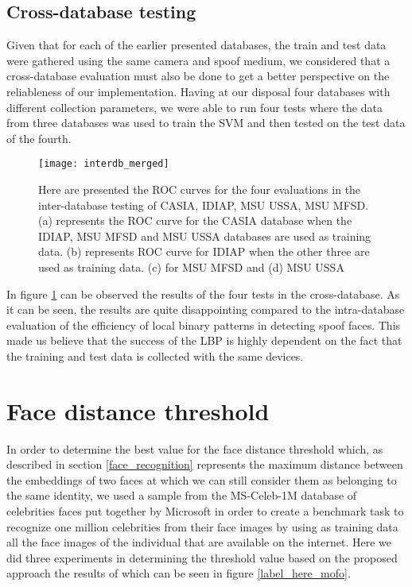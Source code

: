 \subsection{Cross-database testing}\label{section:cross_database_testing}
Given that for each of the earlier presented databases, the train and test data were gathered using the same camera and spoof medium, we considered that a cross-database evaluation must also be done to get a better perspective on the reliableness of our implementation. Having at our disposal four databases with different collection parameters, we were able to run four tests where the data from three databases was used to train the SVM and then tested on the test data of the fourth. 
\begin{figure}[H]
	\captionsetup{width=15cm,font=small}
	\begin{center}
		\texttt{[image: interdb\_merged]}
	\end{center}
	\caption[Cross-database face spoof classification results]{Here are presented the ROC curves for the four evaluations in the inter-database testing of CASIA, IDIAP, MSU USSA, MSU MFSD. (a) represents the ROC curve for the CASIA database when the IDIAP, MSU MFSD and MSU USSA databases are used as training data. (b) represents ROC curve for IDIAP when the other three are used as training data. (c) for MSU MFSD and (d) MSU USSA}
	\label{fig:interdb_results}
\end{figure}
In figure \ref{fig:interdb_results} can be observed the results of the four tests in the cross-database. As it can be seen, the results are quite disappointing compared to the intra-database evaluation of the efficiency of local binary patterns in detecting spoof faces. This made us believe that the success of the LBP is highly dependent on the fact that the training and test data is collected with the same devices.

\section{Face distance threshold}
In order to determine the best value for the face distance threshold which, as described in section \ref{face_recognition} represents the maximum distance between the embeddings of two faces at which we can still consider them as belonging to the same identity, we used a sample from the MS-Celeb-1M database of celebrities faces put together by Microsoft in order to create a benchmark task to recognize one million celebrities from their face images by using as training data all the face images of the individual that are available on the internet. Here we did three experiments in determining the threshold value based on the proposed approach the results of which can be seen in figure \ref{label_here_mofo}. 

